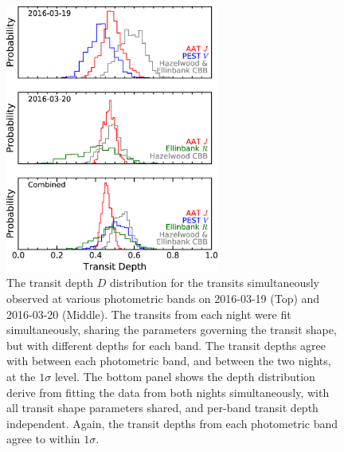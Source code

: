 \documentclass[iop,useAMES,usenatbig]{emulateapj}
\begin{document}
\begin{figure}
    \centering
    \includegraphics[width=7cm]{plots/depth_hist.eps}
    \caption{The transit depth $D$ distribution for the transits simultaneously observed at various photometric bands on 2016-03-19 (Top) and 2016-03-20 (Middle). The transits from each night were fit simultaneously, sharing the parameters governing the transit shape, but with different depths for each band. The transit depths agree with between each photometric band, and between the two nights, at the $1\sigma$ level. The bottom panel shows the depth distribution derive from fitting the data from both nights simultaneously, with all transit shape parameters shared, and per-band transit depth independent. Again, the transit depths from each photometric band agree to within $1\sigma$.}
    \label{fig:depth_hist}
\end{figure}
\end{document}
